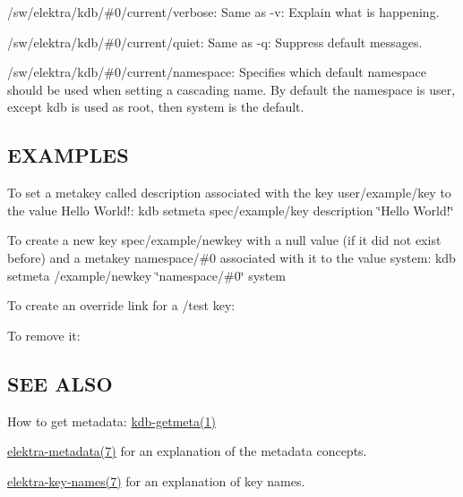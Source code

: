 \begin{DoxyItemize}
\item {\ttfamily /sw/elektra/kdb/\#0/current/verbose}\+: Same as {\ttfamily -\/v}\+: Explain what is happening.
\item {\ttfamily /sw/elektra/kdb/\#0/current/quiet}\+: Same as {\ttfamily -\/q}\+: Suppress default messages.
\item {\ttfamily /sw/elektra/kdb/\#0/current/namespace}\+: Specifies which default namespace should be used when setting a cascading name. By default the namespace is {\ttfamily user}, except {\ttfamily kdb} is used as root, then {\ttfamily system} is the default.
\end{DoxyItemize}

\subsection*{E\+X\+A\+M\+P\+L\+ES}

To set a metakey called {\ttfamily description} associated with the key {\ttfamily user/example/key} to the value {\ttfamily Hello World!}\+: {\ttfamily kdb setmeta spec/example/key description \char`\"{}\+Hello World!\char`\"{}}

To create a new key {\ttfamily spec/example/newkey} with a null value (if it did not exist before) and a metakey {\ttfamily namespace/\#0} associated with it to the value {\ttfamily system}\+: {\ttfamily kdb setmeta /example/newkey \char`\"{}namespace/\#0\char`\"{} system}

To create an override link for a {\ttfamily /test} key\+: 


To remove it\+: 


\subsection*{S\+EE A\+L\+SO}


\begin{DoxyItemize}
\item How to get metadata\+: \hyperlink{md_doc_help_kdb-getmeta_doc_help_kdb-getmeta_md}{kdb-\/getmeta(1)}
\item \hyperlink{md_doc_help_elektra-metadata_doc_help_elektra-metadata_md}{elektra-\/metadata(7)} for an explanation of the metadata concepts.
\item \hyperlink{md_doc_help_elektra-key-names_doc_help_elektra-key-names_md}{elektra-\/key-\/names(7)} for an explanation of key names. 
\end{DoxyItemize}